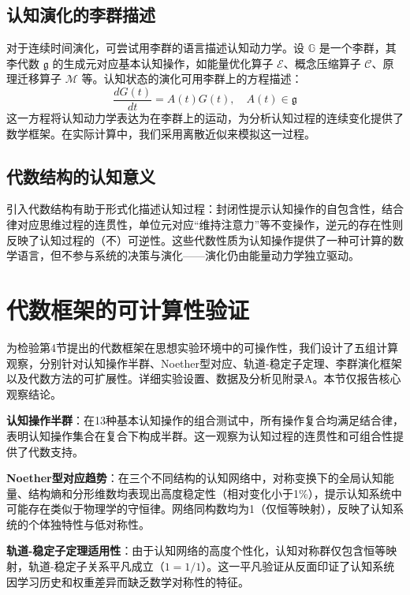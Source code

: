 \documentclass[12pt,a4paper]{article}
\newcommand{\cognitivegroup}{\mathbb{G}}
\newcommand{\energyoperator}{\mathcal{E}}
\newcommand{\compressionoperator}{\mathcal{C}}
\newcommand{\migrationoperator}{\mathcal{M}}
\begin{document}
\subsection{认知演化的李群描述}

对于连续时间演化，可尝试用李群的语言描述认知动力学。设 $\cognitivegroup$ 是一个李群，其李代数 $\mathfrak{g}$ 的生成元对应基本认知操作，如能量优化算子 $\energyoperator$、概念压缩算子 $\compressionoperator$、原理迁移算子 $\migrationoperator$ 等。认知状态的演化可用李群上的方程描述：
\begin{equation}
\frac{dG(t)}{dt} = A(t)G(t), \quad A(t) \in \mathfrak{g}
\end{equation}
这一方程将认知动力学表达为在李群上的运动，为分析认知过程的连续变化提供了数学框架。在实际计算中，我们采用离散近似来模拟这一过程。

\subsection{代数结构的认知意义}

引入代数结构有助于形式化描述认知过程：封闭性提示认知操作的自包含性，结合律对应思维过程的连贯性，单位元对应“维持注意力”等不变操作，逆元的存在性则反映了认知过程的（不）可逆性。这些代数性质为认知操作提供了一种可计算的数学语言，但不参与系统的决策与演化——演化仍由能量动力学独立驱动。

\section{代数框架的可计算性验证}
\label{sec:algebraic_experiments}

为检验第4节提出的代数框架在思想实验环境中的可操作性，我们设计了五组计算观察，分别针对认知操作半群、Noether型对应、轨道-稳定子定理、李群演化框架以及代数方法的可扩展性。详细实验设置、数据及分析见附录A。本节仅报告核心观察结论。

\textbf{认知操作半群}：在13种基本认知操作的组合测试中，所有操作复合均满足结合律，表明认知操作集合在复合下构成半群。这一观察为认知过程的连贯性和可组合性提供了代数支持。

\textbf{Noether型对应趋势}：在三个不同结构的认知网络中，对称变换下的全局认知能量、结构熵和分形维数均表现出高度稳定性（相对变化小于1\%），提示认知系统中可能存在类似于物理学的守恒律。网络同构数均为1（仅恒等映射），反映了认知系统的个体独特性与低对称性。

\textbf{轨道-稳定子定理适用性}：由于认知网络的高度个性化，认知对称群仅包含恒等映射，轨道-稳定子关系平凡成立（$1 = 1/1$）。这一平凡验证从反面印证了认知系统因学习历史和权重差异而缺乏数学对称性的特征。
\end{document}
